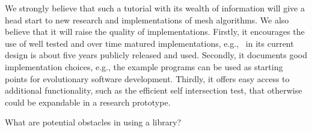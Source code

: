 We strongly believe that such a tutorial with its wealth of
information will give a head start to new research and implementations
of mesh algorithms. We also believe that it will raise the quality of
implementations. Firstly, it encourages the use of well tested and
over time matured implementations, e.g., \cgalpoly\ in its current
design is about five years publicly released and used. Secondly, it
documents good implementation choices, e.g., the example programs can
be used as starting points for evolutionary software development.
Thirdly, it offers easy access to additional functionality, such as
the efficient self intersection test, that otherwise could be
expandable in a research prototype.

\noindent
What are potential obstacles in using a library?

